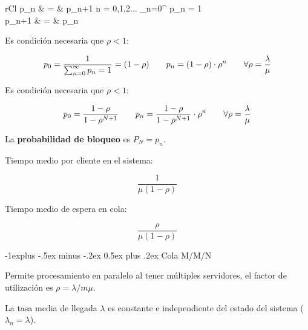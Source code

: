 \documentclass[10pt,landscape]{article}
\makeatletter
\renewcommand{\subsection}{\@startsection{subsection}{2}{0mm}%
                                {-1explus -.5ex minus -.2ex}%
                                {0.5ex plus .2ex}%
                                {\normalfont\normalsize\bfseries}}
\makeatother
\begin{document}
\begin{multicols}{3}
	
	\begin{IEEEeqnarray*}{rCl}
		\lambda \cdot p_{n} & = & \mu \cdot p_{n+1}  \hspace{10pt} n = 0,1,2... \hspace{10pt} \sum_{n=0}^{\infty} p_{n} = 1\\
			p_{n+1} & = & \rho \cdot p_{n}
	\end{IEEEeqnarray*}
	





Es condición necesaria que $\rho < 1$:

	\begin{equation*}
		p_{0} = \frac{1}{\sum_{n=0}^{\infty} p_{n} = 1} =(1 - \rho) \hspace{20 pt} p_{n} = (1-\rho) \cdot \rho^{n} \hspace{20 pt} \forall \rho = \frac{\lambda}{\mu}
	\end{equation*}
	


Es condición necesaria que $\rho < 1$:

	\begin{equation*}
		p_{0} = \frac{1 - \rho}{1 - \rho^{N+1}} \hspace{20 pt} p_{n} =\frac{1 - \rho}{1 - \rho^{N+1}} \cdot \rho^{n} \hspace{20 pt} \forall \rho = \frac{\lambda}{\mu}
	\end{equation*}

La \textbf{probabilidad de bloqueo} es $P_{N} = p_{n}$.

Tiempo medio por cliente en el sistema:

	\begin{equation*}
	\frac{1}{\mu ( 1 - \rho)}
	\end{equation*}
	
Tiempo medio de espera en cola:

	\begin{equation*}
	\frac{\rho}{\mu (1 - \rho)}
	\end{equation*}

\subsection{Cola M/M/N}

Permite procesamiento en paralelo al tener múltiples servidores, el factor de utilización es $\rho = \lambda / m \mu$.

La tasa media de llegada $\lambda$ es constante e independiente del estado del sistema ($\lambda_{n} = \lambda$).


\end{multicols}
\end{document}
